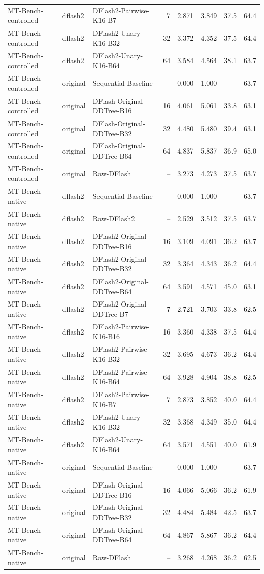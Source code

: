 \begin{longtable}{lllrrrrr}
MT-Bench-controlled & dflash2 & DFlash2-Pairwise-K16-B7 & 7 & 2.871 & 3.849 & 37.5 & 64.4 \\
MT-Bench-controlled & dflash2 & DFlash2-Unary-K16-B32 & 32 & 3.372 & 4.352 & 37.5 & 64.4 \\
MT-Bench-controlled & dflash2 & DFlash2-Unary-K16-B64 & 64 & 3.584 & 4.564 & 38.1 & 63.7 \\
MT-Bench-controlled & original & Sequential-Baseline & -- & 0.000 & 1.000 & -- & 63.7 \\
MT-Bench-controlled & original & DFlash-Original-DDTree-B16 & 16 & 4.061 & 5.061 & 33.8 & 63.1 \\
MT-Bench-controlled & original & DFlash-Original-DDTree-B32 & 32 & 4.480 & 5.480 & 39.4 & 63.1 \\
MT-Bench-controlled & original & DFlash-Original-DDTree-B64 & 64 & 4.837 & 5.837 & 36.9 & 65.0 \\
MT-Bench-controlled & original & Raw-DFlash & -- & 3.273 & 4.273 & 37.5 & 63.7 \\
MT-Bench-native & dflash2 & Sequential-Baseline & -- & 0.000 & 1.000 & -- & 63.7 \\
MT-Bench-native & dflash2 & Raw-DFlash2 & -- & 2.529 & 3.512 & 37.5 & 63.7 \\
MT-Bench-native & dflash2 & DFlash2-Original-DDTree-B16 & 16 & 3.109 & 4.091 & 36.2 & 63.7 \\
MT-Bench-native & dflash2 & DFlash2-Original-DDTree-B32 & 32 & 3.364 & 4.343 & 36.2 & 64.4 \\
MT-Bench-native & dflash2 & DFlash2-Original-DDTree-B64 & 64 & 3.591 & 4.571 & 45.0 & 63.1 \\
MT-Bench-native & dflash2 & DFlash2-Original-DDTree-B7 & 7 & 2.721 & 3.703 & 33.8 & 62.5 \\
MT-Bench-native & dflash2 & DFlash2-Pairwise-K16-B16 & 16 & 3.360 & 4.338 & 37.5 & 64.4 \\
MT-Bench-native & dflash2 & DFlash2-Pairwise-K16-B32 & 32 & 3.695 & 4.673 & 36.2 & 64.4 \\
MT-Bench-native & dflash2 & DFlash2-Pairwise-K16-B64 & 64 & 3.928 & 4.904 & 38.8 & 62.5 \\
MT-Bench-native & dflash2 & DFlash2-Pairwise-K16-B7 & 7 & 2.873 & 3.852 & 40.0 & 64.4 \\
MT-Bench-native & dflash2 & DFlash2-Unary-K16-B32 & 32 & 3.368 & 4.349 & 35.0 & 64.4 \\
MT-Bench-native & dflash2 & DFlash2-Unary-K16-B64 & 64 & 3.571 & 4.551 & 40.0 & 61.9 \\
MT-Bench-native & original & Sequential-Baseline & -- & 0.000 & 1.000 & -- & 63.7 \\
MT-Bench-native & original & DFlash-Original-DDTree-B16 & 16 & 4.066 & 5.066 & 36.2 & 61.9 \\
MT-Bench-native & original & DFlash-Original-DDTree-B32 & 32 & 4.484 & 5.484 & 42.5 & 63.7 \\
MT-Bench-native & original & DFlash-Original-DDTree-B64 & 64 & 4.867 & 5.867 & 36.2 & 64.4 \\
MT-Bench-native & original & Raw-DFlash & -- & 3.268 & 4.268 & 36.2 & 62.5 \\
\end{longtable}


